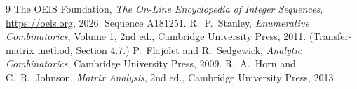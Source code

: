 \documentclass[11pt,a4paper]{article}
\theoremstyle{plain}
\theoremstyle{definition}
\begin{document}
\begin{thebibliography}{9}
 The OEIS Foundation, \emph{The On-Line Encyclopedia of Integer
Sequences}, \url{https://oeis.org}, 2026. Sequence A181251.
 R.~P.~Stanley, \emph{Enumerative Combinatorics}, Volume 1, 2nd ed.,
Cambridge University Press, 2011. (Transfer-matrix method, Section 4.7.)
 P.~Flajolet and R.~Sedgewick, \emph{Analytic Combinatorics}, Cambridge
University Press, 2009.
 R.~A.~Horn and C.~R.~Johnson, \emph{Matrix Analysis}, 2nd ed., Cambridge
University Press, 2013.
\end{thebibliography}
\end{document}
